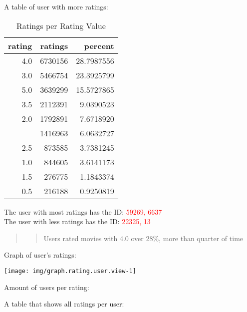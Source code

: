 \documentclass[]{article}
\begin{document}
A table of user with more ratings:

\begin{table}[!h]

\caption{\label{tab:table.rating.user.show}Ratings per Rating Value}
\centering
\begin{tabular}{rrr}
\toprule
rating & ratings & percent\\
\midrule
\rowcolor{gray!6}  4.0 & 6730156 & 28.7987556\\
3.0 & 5466754 & 23.3925799\\
\rowcolor{gray!6}  5.0 & 3639299 & 15.5727865\\
3.5 & 2112391 & 9.0390523\\
\rowcolor{gray!6}  2.0 & 1792891 & 7.6718920\\
\addlinespace
4.5 & 1416963 & 6.0632727\\
\rowcolor{gray!6}  2.5 & 873585 & 3.7381245\\
1.0 & 844605 & 3.6141173\\
\rowcolor{gray!6}  1.5 & 276775 & 1.1843374\\
0.5 & 216188 & 0.9250819\\
\bottomrule
\end{tabular}
\end{table}

The user with most ratings has the ID: \textcolor{red}{59269, 6637}\\
The user with less ratings has the ID: \textcolor{red}{22325, 13}

\begin{quote}
\begin{quote}
Users rated movies with 4.0 over 28\%, more than quarter of time
\end{quote}
\end{quote}

Graph of user's ratings:

\begin{center}\texttt{[image: img/graph.rating.user.view-1]} \end{center}

Amount of users per rating:

A table that shows all ratings per user:
\end{document}
